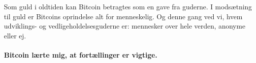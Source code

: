Som guld i oldtiden kan Bitcoin betragtes som en gave fra guderne. I modsætning til guld er Bitcoins oprindelse alt for menneskelig. Og denne gang ved vi, hvem udviklings- og vedligeholdelsesguderne er: mennesker over hele verden, anonyme eller ej.

\paragraph{Bitcoin lærte mig, at fortællinger er vigtige.}

%
%
%
%
